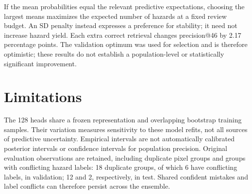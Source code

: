 \documentclass[10pt,a4paper]{article}
\begin{document}
If the mean probabilities equal the relevant predictive expectations, choosing
the largest means maximizes the expected number of hazards at a fixed review
budget. An SD penalty instead expresses a preference for stability; it need not
increase hazard yield. Each extra correct retrieval changes precision@46 by
2.17 percentage points. The validation optimum was used for selection and is
therefore optimistic; these results do not establish a population-level or
statistically significant improvement.

\section{Limitations}
The 128 heads share a frozen representation and overlapping bootstrap training
samples. Their variation measures sensitivity to these model refits, not all
sources of predictive uncertainty. Empirical intervals are not automatically
calibrated posterior intervals or confidence intervals for population precision.
Original evaluation observations are retained, including duplicate pixel groups
and groups with conflicting hazard labels: 18 duplicate groups, of which 6 have
conflicting labels, in validation; 12 and 2, respectively, in test. Shared confident
mistakes and label conflicts can therefore persist across the ensemble.
\end{document}
